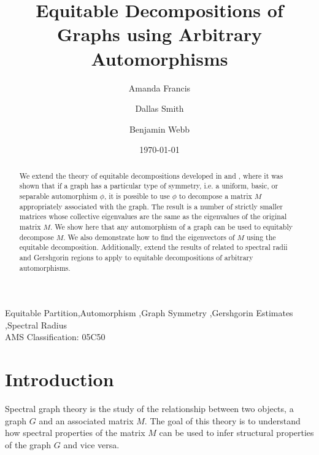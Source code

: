 \documentclass[preprint,12pt]{elsarticle}
\theoremstyle{definition}
\theoremstyle{remark}
\begin{document}
\begin{frontmatter}

\date{\today}

\title{Equitable Decompositions of Graphs using Arbitrary Automorphisms}
\author[amanda]{Amanda Francis}
\address[amanda]{Department of Mathematics, Engineering, and Computer Science, Carroll College, Helena, MT 59601, USA, afrancis@carroll.edu}
\author[dallas]{Dallas Smith}
\address[dallas]{Department of Mathematics, Brigham Young University, Provo, UT 84602, USA, dallas.smith@mathematics.byu.edu }
\author[ben]{Benjamin Webb}
\address[ben]{Department of Mathematics, Brigham Young University, Provo, UT 84602, USA, bwebb@math.byu.edu}

\begin{abstract}
We extend the theory of equitable decompositions developed in \cite{BFW} and \cite{FSSW}, where it was shown that if a graph has a particular type of symmetry, i.e. a uniform, basic, or separable automorphism $\phi$, it is possible to use $\phi$ to decompose a matrix $M$ appropriately associated with the graph. The result is a number of strictly smaller matrices whose collective eigenvalues are the same as the eigenvalues of the original matrix $M$. We show here that any automorphism of a graph can be used to equitably decompose $M$. We also demonstrate how to find the eigenvectors of $M$ using the equitable decomposition. Additionally, extend the results of \cite{FSSW} related to spectral radii and Gershgorin regions to apply to equitable decompositions of arbitrary automorphisms.

\end{abstract}

\begin{keyword}
Equitable Partition\sep Automorphism \sep Graph Symmetry \sep Gershgorin Estimates \sep Spectral Radius\\
AMS Classification: 05C50
\end{keyword}


\end{frontmatter}
\section{Introduction}

Spectral graph theory is the study of the relationship between two objects, a graph $G$ and an associated matrix $M$. The goal of this theory is to understand how spectral properties of the matrix $M$ can be used to infer structural properties of the graph $G$ and vice versa.
\end{document}
